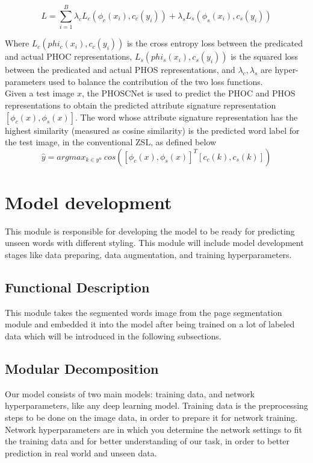 \begin{equation}
    L= \sum_{i=1}^B \lambda_c L_c(\phi_c(x_i), c_c(y_i)) + \lambda_s L_s(\phi_s(x_i), c_s(y_i))
    \label{equ:phosc-loss-function}
\end{equation}

Where $L_c(phi_c(x_i), c_c(y_i))$ is the cross entropy loss between the predicated and actual PHOC representations, $L_s(phi_s(x_i), c_s(y_i))$ is the squared loss between the predicated and actual PHOS representations, and $\lambda_c , \lambda_s$ are hyper-parameters used to balance the contribution of the two loss functions. \\

Given a test image $x$, the PHOSCNet is used to predict the PHOC and PHOS representations to obtain the predicted attribute signature representation $[\phi_c(x), \phi_s(x)]$. The  word whose attribute signature representation has the highest similarity (measured as cosine similarity) is the predicted word label for the test image, in the conventional ZSL, as defined below
\begin{equation}
    \hat y = argmax_{k\in y^u} \: cos([\phi_c(x), \phi_s(x)]^T[c_c(k), c_s(k)])
    \label{equ:cosine-similarity}
\end{equation}

\section{Model development}
This module is responsible for developing the model to be ready for predicting unseen words with different styling. This module will include model development stages like data preparing, data augmentation, and training hyperparameters.

\subsection{Functional Description}
This module takes the segmented words image from the page segmentation module and embedded it into the model after being trained on a lot of labeled data which will be introduced in the following subsections.


\subsection{Modular Decomposition}
Our model consists of two main models: training data, and network hyperparameters, like any deep learning model. Training data is the preprocessing steps to be done on the image data, in order to prepare it for network training. Network hyperparameters are in which you determine the network settings to fit the training data and for better understanding of our task, in order to better prediction in real world and unseen data.

